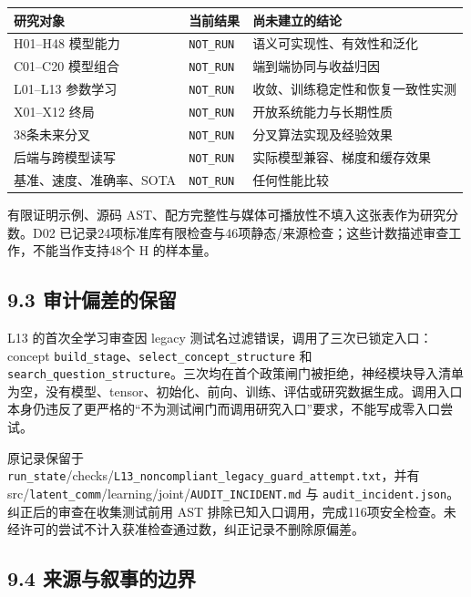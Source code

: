 \documentclass[
  10pt,
]{article}
\begin{document}
\begin{longtable}[]{@{}lll@{}}
\toprule\noalign{}
研究对象 & 当前结果 & 尚未建立的结论 \\
\midrule\noalign{}
\endhead
\bottomrule\noalign{}
\endlastfoot
H01--H48 模型能力 & \nolinkurl{NOT_RUN} & 语义可实现性、有效性和泛化 \\
C01--C20 模型组合 & \nolinkurl{NOT_RUN} & 端到端协同与收益归因 \\
L01--L13 参数学习 & \nolinkurl{NOT_RUN} &
收敛、训练稳定性和恢复一致性实测 \\
X01--X12 终局 & \nolinkurl{NOT_RUN} & 开放系统能力与长期性质 \\
38条未来分叉 & \nolinkurl{NOT_RUN} & 分叉算法实现及经验效果 \\
后端与跨模型读写 & \nolinkurl{NOT_RUN} & 实际模型兼容、梯度和缓存效果 \\
基准、速度、准确率、SOTA & \nolinkurl{NOT_RUN} & 任何性能比较 \\
\end{longtable}

有限证明示例、源码
AST、配方完整性与媒体可播放性不填入这张表作为研究分数。D02
已记录24项标准库有限检查与46项静态/来源检查；这些计数描述审查工作，不能当作支持48个
H 的样本量。

\subsection{9.3
审计偏差的保留}\label{ux5ba1ux8ba1ux504fux5deeux7684ux4fddux7559}

L13 的首次全学习审查因 legacy
测试名过滤错误，调用了三次已锁定入口：concept
\nolinkurl{build_stage}、\nolinkurl{select_concept_structure} 和
\nolinkurl{search_question_structure}。三次均在首个政策闸门被拒绝，神经模块导入清单为空，没有模型、tensor、初始化、前向、训练、评估或研究数据生成。调用入口本身仍违反了更严格的``不为测试闸门而调用研究入口''要求，不能写成零入口尝试。

原记录保留于
\nolinkurl{run_state}/checks/\nolinkurl{L13_noncompliant_legacy_guard_attempt.txt}，并有
src/\nolinkurl{latent_comm}/learning/joint/\nolinkurl{AUDIT_INCIDENT.md}
与 \nolinkurl{audit_incident.json}。纠正后的审查在收集测试前用 AST
排除已知入口调用，完成116项安全检查。未经许可的尝试不计入获准检查通过数，纠正记录不删除原偏差。

\subsection{9.4
来源与叙事的边界}\label{ux6765ux6e90ux4e0eux53d9ux4e8bux7684ux8fb9ux754c}
\end{document}
